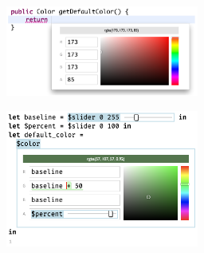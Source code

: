  \begin{figure}[htb]
   \begin{minipage}[b]{0.3\textwidth}
     \begin{subfigure}[b]{0.3\textwidth}
       \includegraphics[width=15pc]{graphite-color-palette.png}
       \caption{}
     \end{subfigure}
     \begin{subfigure}[b]{0.3\textwidth}
       \includegraphics[width=15pc]{slider-color-livelits.png}
       \caption{}
      \end{subfigure}
  \end{minipage}
 

\end{figure}
